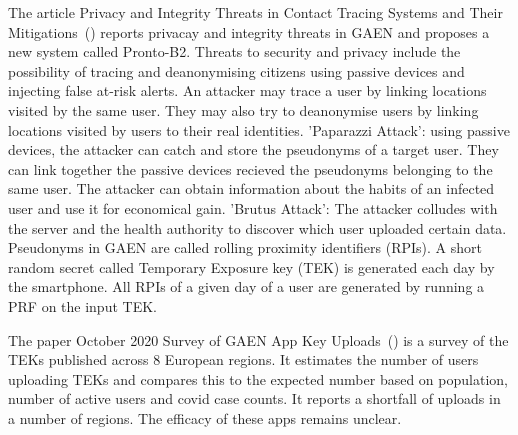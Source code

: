 The article Privacy and Integrity Threats in Contact
Tracing Systems and Their Mitigations~(\cite{9928557}) reports privacay and integrity threats in GAEN and proposes a new system called Pronto-B2. Threats to security and privacy include the possibility of tracing and deanonymising citizens using passive devices and injecting false at-risk alerts. An attacker may trace a user by linking locations visited by the same user. They may also try to deanonymise users by linking locations visited by users to their real identities. 'Paparazzi Attack': using passive devices, the attacker can catch and store the pseudonyms of a target user. They can link together the passive devices recieved the pseudonyms belonging to the same user. The attacker can obtain information about the habits of an infected user and use it for economical gain. 'Brutus Attack': The attacker colludes with the server and the health authority to discover which user uploaded certain data. Pseudonyms in GAEN are called rolling proximity identifiers (RPIs). A short random secret called Temporary Exposure key (TEK) is generated each day by the smartphone. All RPIs of a given day of a user are generated by running a PRF on the input TEK.\par

The paper October 2020 Survey of GAEN App Key Uploads~(\cite{survey}) is a survey of the TEKs published across 8 European regions. It estimates the number of users uploading TEKs and compares this to the expected number based on population, number of active users and covid case counts. It reports a shortfall of uploads in a number of regions. The efficacy of these apps remains unclear.\par

